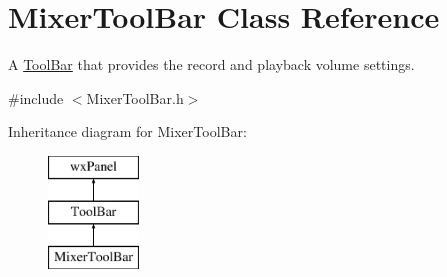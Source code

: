 \hypertarget{class_mixer_tool_bar}{}\section{Mixer\+Tool\+Bar Class Reference}
\label{class_mixer_tool_bar}


A \hyperlink{class_tool_bar}{Tool\+Bar} that provides the record and playback volume settings.  




{\ttfamily \#include $<$Mixer\+Tool\+Bar.\+h$>$}

Inheritance diagram for Mixer\+Tool\+Bar\+:\begin{figure}[H]
\begin{center}
\leavevmode
\includegraphics[height=3.000000cm]{class_mixer_tool_bar}
\end{center}
\end{figure}
